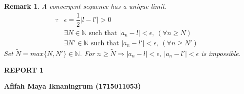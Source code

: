 \documentclass[a4paper,10pt]{article}
\newtheorem{remark}{Remark}
\newcommand{\N}{\mathbb{N}}
\begin{document}
\begin{remark}
	A convergent sequence has a unique limit.\\
	\begin{eqnarray} \nonumber
	\because & \epsilon = \dfrac{1}{2}|l-l\prime|>0 \\ \nonumber
	& \exists N\in\N \text{ such that } |a_{n}-l| < \epsilon, \ (\forall n \geq N) \\ \nonumber
	& \exists N\prime\in\N \text{ such that } |a_{n}-l\prime| < \epsilon, \ (\forall n \geq N\prime)
	\end{eqnarray}
	Set $ \tilde{N} = max \{ N,N\prime \} \in \N $. For $ n\geq \tilde{N} \Rightarrow |a_{n}-l|<\epsilon, \ |a_{n}-l\prime|<\epsilon $ is impossible.
\end{remark}

\newpage 
\textbf{REPORT 1}

\textbf{Afifah Maya Iknaningrum (1715011053)}
\end{document}
